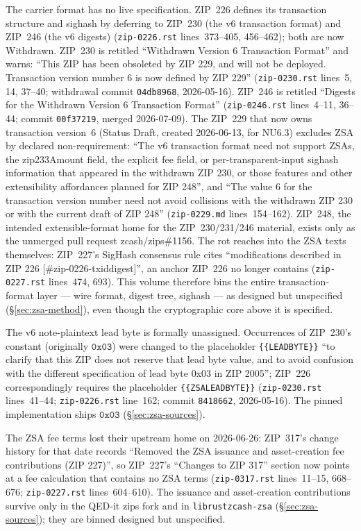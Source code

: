\documentclass[11pt,a4paper]{article}
\theoremstyle{definition}
\begin{document}
The carrier format has no live specification. ZIP~226 defines its transaction
structure and sighash by deferring to ZIP~230 (the v6 transaction format) and
ZIP~246 (the v6 digests) (\texttt{zip-0226.rst} lines~373--405, 456--462);
both are now Withdrawn. ZIP~230 is retitled ``Withdrawn Version 6 Transaction
Format'' and warns: ``This ZIP has been obsoleted by ZIP 229, and will not be
deployed. Transaction version number 6 is now defined by ZIP 229''
(\texttt{zip-0230.rst} lines~5, 14, 37--40; withdrawal commit
\texttt{04db8968}, 2026-05-16). ZIP~246 is retitled ``Digests for the
Withdrawn Version 6 Transaction Format'' (\texttt{zip-0246.rst} lines~4--11,
36--44; commit \texttt{00f37219}, merged 2026-07-09). The ZIP~229 that now
owns transaction version~6 (Status Draft, created 2026-06-13, for NU6.3)
excludes ZSA by declared non-requirement: ``The v6 transaction format need not
support ZSAs, the zip233Amount field, the explicit fee field, or
per-transparent-input sighash information that appeared in the withdrawn ZIP
230, or those features and other extensibility affordances planned for ZIP
248'', and ``The value 6 for the transaction version number need not avoid
collisions with the withdrawn ZIP 230 or with the current draft of ZIP 248''
(\texttt{zip-0229.md} lines~154--162). ZIP~248, the intended extensible-format
home for the ZIP~230/231/246 material, exists only as the unmerged pull
request zcash/zips\#1156. The rot reaches into the ZSA texts themselves:
ZIP~227's SigHash consensus rule cites ``modifications described in ZIP 226
[\#zip-0226-txiddigest]'', an anchor ZIP~226 no longer contains
(\texttt{zip-0227.rst} lines~474, 693). This volume therefore bins the entire
transaction-format layer --- wire format, digest tree, sighash --- as designed
but unspecified (\S\ref{sec:zsa-method}), even though the cryptographic core
above it is specified.

The v6 note-plaintext lead byte is formally unassigned. Occurrences of
ZIP~230's constant (originally $\mathtt{0x03}$) were changed to the
placeholder \texttt{\{\{LEADBYTE\}\}} ``to clarify that this ZIP does not
reserve that lead byte value, and to avoid confusion with the different
specification of lead byte 0x03 in ZIP 2005''; ZIP~226 correspondingly
requires the placeholder \texttt{\{\{ZSALEADBYTE\}\}} (\texttt{zip-0230.rst}
lines~41--44; \texttt{zip-0226.rst} line~162; commit \texttt{8418662},
2026-05-16). The pinned implementation ships $\mathtt{0x03}$
(\S\ref{sec:zsa-sources}).

The ZSA fee terms lost their upstream home on 2026-06-26: ZIP~317's change
history for that date records ``Removed the ZSA issuance and asset-creation
fee contributions (ZIP 227)'', so ZIP~227's ``Changes to ZIP 317'' section now
points at a fee calculation that contains no ZSA terms (\texttt{zip-0317.rst}
lines~11--15, 668--676; \texttt{zip-0227.rst} lines~604--610). The issuance
and asset-creation contributions survive only in the QED-it zips fork and in
\texttt{librustzcash-zsa} (\S\ref{sec:zsa-sources}); they are binned designed
but unspecified.
\end{document}
